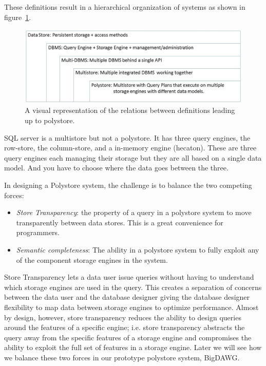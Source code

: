 \documentclass[conference]{IEEEtran}
\newcommand{\term}[1]{\emph{#1}}
\begin{document}
These definitions result in a hierarchical organization of 
systems as shown in figure~\ref{fig:defs}.

\begin{figure}[t!]
\centerline{
\includegraphics[width=7.0in]{figures/systems.jpg}
}
\caption{A visual representation of the relations between
  definitions leading up to polystore.}
\label{fig:defs}
\end{figure}

SQL server is a multistore but not a polystore.  It has three query
engines, the row-store, the column-store, and a in-memory 
engine (hecaton).   These are three query engines each managing
their storage but they are all based on a single data model.  And you 
have to choose where the data goes between the three.


In designing a Polystore system, the challenge is to balance the
two competing forces:
\begin{itemize}

\item \term{Store Transparency}: the property of a query in a 
polystore system to move transparently between data stores. This 
is a great convenience for programmers.

\item \term{Semantic completeness}: The ability in a polystore system
to fully exploit any of the component storage engines in the system.

\end{itemize}

Store Transparency lets a data user issue queries without having
to understand which storage engines are used in the query.  This 
creates a separation of concerns between the data user and the
database designer giving the database designer flexibility to map
data between storage engines to optimize performance.   Almost
by design, however, store transparency reduces the ability to
design queries around the features of a specific engine; i.e. 
store transparency abstracts the query away from the specific
features of a storage engine and compromises the ability to exploit
the full set of features in a storage engine.   Later we will
see how we balance these two forces in our prototype 
polystore system, BigDAWG.
\end{document}
